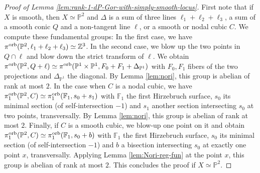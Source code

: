 \documentclass{amsart}
\newcommand{\pp}{\mathbb{P}}
\newcommand{\zz}{\mathbb{Z}}
\newtheorem{lemma}[theorem]{Lemma}
\theoremstyle{definition}
\theoremstyle{remark}
\numberwithin{equation}{section}
\begin{document}

\begin{proof}[Proof of Lemma \ref{lem:rank-1-dP-Gor-with-simply-smooth-locus}]
First note that if $X$ is smooth, then $X\simeq \pp^2$ and $\Delta$ is a sum of three lines $\ell_1+\ell_2+\ell_3$, a sum of a smooth conic $Q$ and a non-tangent line $\ell$, or a smooth or nodal cubic $C$. We compute these fundamental groups: In the first case, we have $\pi^{\rm orb}(\pp^2,\ell_1+\ell_2+\ell_3)\simeq \zz^3$. In the second case, we blow up the two points in $Q\cap \ell$ and blow down the strict transform of $\ell$. We obtain $\pi^{\rm orb}(\pp^2,Q + \ell)\simeq \pi^{\rm orb}(\pp^1\times\pp^1,F_0+F_1+\Delta_{\pp^1})$ with $F_0,F_1$ fibers of the two projections and $\Delta_{\pp^1}$ the diagonal. By Lemma \ref{lem:nori}, this group is abelian of rank at most $2$. 
In the case when $C$ is a nodal cubic, we have $\pi_1^{\rm orb}(\pp^2,C)\simeq \pi_1^{\rm orb}(\mathbb{F}_1,s_0+s_1)$ with $\mathbb{F}_1$ the first Hirzebruch surface, $s_0$ its minimal section (of self-intersection $-1$) and $s_1$ another section intersecting $s_0$ at two points, transversally. By Lemma \ref{lem:nori}, this group is abelian of rank at most $2$. 
Finally, if $C$ is a smooth cubic, we blow-up one point on it and obtain $\pi_1^{\rm orb}(\pp^2,C)\simeq \pi_1^{\rm orb}(\mathbb{F}_1,s_0+b)$ with $\mathbb{F}_1$ the first Hirzebruch surface, $s_0$ its minimal section (of self-intersection $-1$) and $b$ a bisection intersecting $s_0$ at exactly one point $x$, transversally. Applying Lemma \ref{lem:Nori-reg-fun} at the point $x$, this group is abelian of rank at most $2$. This concludes the proof if $X\simeq \pp^2$.


\end{proof}
\end{document}

